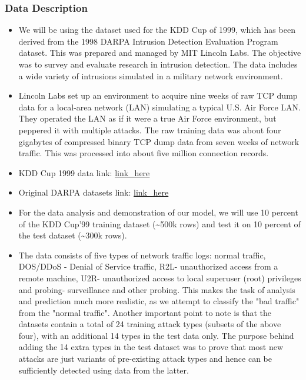 \documentclass[11pt]{article}
\providecommand{\tightlist}{%
      \setlength{\itemsep}{0pt}\setlength{\parskip}{0pt}}
\begin{document}
    \subsubsection{Data Description}\label{data-description}

\begin{itemize}
\tightlist
\item
  We will be using the dataset used for the KDD Cup of 1999, which has
  been derived from the 1998 DARPA Intrusion Detection Evaluation
  Program dataset. This was prepared and managed by MIT Lincoln Labs.
  The objective was to survey and evaluate research in intrusion
  detection. The data includes a wide variety of intrusions simulated in
  a military network environment. 
\item
  Lincoln Labs set up an environment to acquire nine weeks of raw TCP
  dump data for a local-area network (LAN) simulating a typical U.S. Air
  Force LAN. They operated the LAN as if it were a true Air Force
  environment, but peppered it with multiple attacks. The raw training
  data was about four gigabytes of compressed binary TCP dump data from
  seven weeks of network traffic. This was processed into about five
  million connection records. 
\item
  KDD Cup 1999 data link:
  \href{http://kdd.ics.uci.edu/databases/kddcup99/kddcup99.html}{link\_here}
\item
  Original DARPA datasets link:
  \href{https://www.ll.mit.edu/ideval/data/1998data.html}{link\_here} 
\item
  For the data analysis and demonstration of our model, we will use 10
  percent of the KDD Cup'99 training dataset (\textasciitilde{}500k
  rows) and test it on 10 percent of the test dataset
  (\textasciitilde{}300k rows). 
\item
  The data consists of five types of network traffic logs: normal
  traffic, DOS/DDoS - Denial of Service traffic, R2L- unauthorized
  access from a remote machine, U2R- unauthorized access to local
  superuser (root) privileges and probing- surveillance and other
  probing. This makes the task of analysis and prediction much more
  realistic, as we attempt to classify the "bad traffic" from the
  "normal traffic". Another important point to note is that the datasets
  contain a total of 24 training attack types (subsets of the above
  four), with an additional 14 types in the test data only. The purpose
  behind adding the 14 extra types in the test dataset was to prove that
  most new attacks are just variants of pre-existing attack types and
  hence can be sufficiently detected using data from the latter.
\end{itemize}
\end{document}
